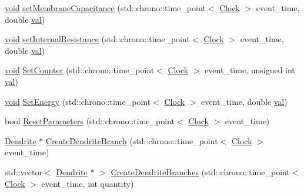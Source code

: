 \begin{DoxyCompactItemize}
\item 
\mbox{\hyperlink{glad_8h_a950fc91edb4504f62f1c577bf4727c29}{void}} \mbox{\hyperlink{class_dendrite_a6fed149ffe00cf781a41a9f260f8eeb2}{set\+Membrane\+Capacitance}} (std\+::chrono\+::time\+\_\+point$<$ \mbox{\hyperlink{universe_8h_a0ef8d951d1ca5ab3cfaf7ab4c7a6fd80}{Clock}} $>$ event\+\_\+time, double \mbox{\hyperlink{glad_8h_a26942fd2ed566ef553eae82d2c109c8f}{val}})
\item 
\mbox{\hyperlink{glad_8h_a950fc91edb4504f62f1c577bf4727c29}{void}} \mbox{\hyperlink{class_dendrite_ac79018e356cec31be05518b85c73a54d}{set\+Internal\+Resistance}} (std\+::chrono\+::time\+\_\+point$<$ \mbox{\hyperlink{universe_8h_a0ef8d951d1ca5ab3cfaf7ab4c7a6fd80}{Clock}} $>$ event\+\_\+time, double \mbox{\hyperlink{glad_8h_a26942fd2ed566ef553eae82d2c109c8f}{val}})
\item 
\mbox{\hyperlink{glad_8h_a950fc91edb4504f62f1c577bf4727c29}{void}} \mbox{\hyperlink{class_dendrite_a7529495515de74fff2b9a92b12531057}{Set\+Counter}} (std\+::chrono\+::time\+\_\+point$<$ \mbox{\hyperlink{universe_8h_a0ef8d951d1ca5ab3cfaf7ab4c7a6fd80}{Clock}} $>$ event\+\_\+time, unsigned int \mbox{\hyperlink{glad_8h_a26942fd2ed566ef553eae82d2c109c8f}{val}})
\item 
\mbox{\hyperlink{glad_8h_a950fc91edb4504f62f1c577bf4727c29}{void}} \mbox{\hyperlink{class_dendrite_ad341dcd42c9d5d486be1e8268d8bca27}{Set\+Energy}} (std\+::chrono\+::time\+\_\+point$<$ \mbox{\hyperlink{universe_8h_a0ef8d951d1ca5ab3cfaf7ab4c7a6fd80}{Clock}} $>$ event\+\_\+time, double \mbox{\hyperlink{glad_8h_a26942fd2ed566ef553eae82d2c109c8f}{val}})
\item 
bool \mbox{\hyperlink{class_dendrite_a6a6290955348051819badb801b753901}{Reset\+Parameters}} (std\+::chrono\+::time\+\_\+point$<$ \mbox{\hyperlink{universe_8h_a0ef8d951d1ca5ab3cfaf7ab4c7a6fd80}{Clock}} $>$ event\+\_\+time)
\item 
\mbox{\hyperlink{class_dendrite}{Dendrite}} $\ast$ \mbox{\hyperlink{class_dendrite_ac7b30397a4753f9c37e96ed716e275eb}{Create\+Dendrite\+Branch}} (std\+::chrono\+::time\+\_\+point$<$ \mbox{\hyperlink{universe_8h_a0ef8d951d1ca5ab3cfaf7ab4c7a6fd80}{Clock}} $>$ event\+\_\+time)
\item 
std\+::vector$<$ \mbox{\hyperlink{class_dendrite}{Dendrite}} $\ast$ $>$ \mbox{\hyperlink{class_dendrite_a812b9cd99ae7d81023bfa25c8f563e96}{Create\+Dendrite\+Branches}} (std\+::chrono\+::time\+\_\+point$<$ \mbox{\hyperlink{universe_8h_a0ef8d951d1ca5ab3cfaf7ab4c7a6fd80}{Clock}} $>$ event\+\_\+time, int quantity)
\item 

\end{DoxyCompactItemize}
